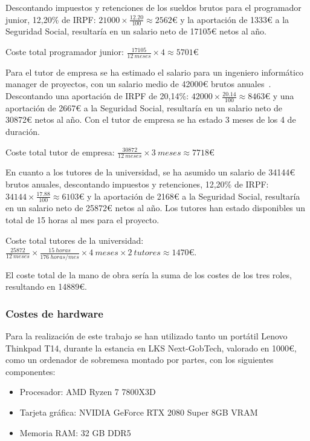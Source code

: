 Descontando impuestos y retenciones de los sueldos brutos para el programador junior, 12,20\% de IRPF: \(21000 \times \frac{12.20}{100} \approx 2562\)€ y la aportación de 1333€ a la Seguridad Social, resultaría en un salario neto de 17105€ netos al año.

\begin{center}
    Coste total programador junior: \(\frac{17105}{12~meses} \times 4 \approx 5701\)€
\end{center}

Para el tutor de empresa se ha estimado el salario para un ingeniero informático manager de proyectos, con un salario medio de 42000€ brutos anuales~\cite{glassdoor}. Descontando una aportación de IRPF de 20,14\%: \(42000 \times \frac{20.14}{100} \approx 8463\)€ y una aportación de 2667€ a la Seguridad Social, resultaría en un salario neto de 30872€ netos al año. Con el tutor de empresa se ha estado 3 meses de los 4 de duración.

\begin{center}
    Coste total tutor de empresa: \(\frac{30872}{12~meses} \times {3~meses} \approx 7718\)€
\end{center}

En cuanto a los tutores de la universidad, se ha asumido un salario de 34144€ brutos anuales, descontando impuestos y retenciones, 12,20\% de IRPF: \(34144 \times \frac{17.88}{100} \approx 6103\)€ y la aportación de 2168€ a la Seguridad Social, resultaría en un salario neto de 25872€ netos al año. Los tutores han estado disponibles un total de 15 horas al mes para el proyecto.
\begin{center}
    Coste total tutores de la universidad: \(\frac{25872}{12~meses} \times \frac{15~horas}{176~horas/mes} \times {4~meses} \times {2~tutores} \approx 1470\)€.
\end{center}

El coste total de la mano de obra sería la suma de los costes de los tres roles, resultando en 14889€.

\subsubsection{Costes de hardware}
Para la realización de este trabajo se han utilizado tanto un portátil Lenovo Thinkpad T14, durante la estancia en LKS Next-GobTech, valorado en 1000€, como un ordenador de sobremesa montado por partes, con los siguientes componentes:

\begin{itemize}
    \item Procesador: AMD Ryzen 7 7800X3D
    \item Tarjeta gráfica: NVIDIA GeForce RTX 2080 Super 8GB VRAM
    \item Memoria RAM: 32 GB DDR5
\end{itemize}

